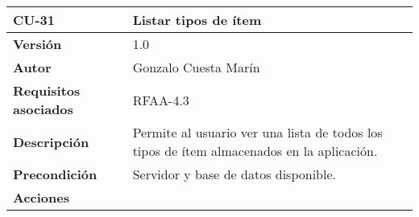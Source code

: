 \begin{longtable}[]{@{}ll@{}}
\toprule
\begin{minipage}[b]{0.18\columnwidth}\raggedright
\textbf{CU-31}\strut
\end{minipage} & \begin{minipage}[b]{0.76\columnwidth}\raggedright
\textbf{Listar tipos de ítem}\strut
\end{minipage}\tabularnewline
\midrule
\endhead
\begin{minipage}[t]{0.18\columnwidth}\raggedright
\textbf{Versión}\strut
\end{minipage} & \begin{minipage}[t]{0.76\columnwidth}\raggedright
1.0\strut
\end{minipage}\tabularnewline
\begin{minipage}[t]{0.18\columnwidth}\raggedright
\textbf{Autor}\strut
\end{minipage} & \begin{minipage}[t]{0.76\columnwidth}\raggedright
Gonzalo Cuesta Marín\strut
\end{minipage}\tabularnewline
\begin{minipage}[t]{0.18\columnwidth}\raggedright
\textbf{Requisitos asociados}\strut
\end{minipage} & \begin{minipage}[t]{0.76\columnwidth}\raggedright
RFAA-4.3\strut
\end{minipage}\tabularnewline
\begin{minipage}[t]{0.18\columnwidth}\raggedright
\textbf{Descripción}\strut
\end{minipage} & \begin{minipage}[t]{0.76\columnwidth}\raggedright
Permite al usuario ver una lista de todos los tipos de ítem almacenados
en la aplicación.\strut
\end{minipage}\tabularnewline
\begin{minipage}[t]{0.18\columnwidth}\raggedright
\textbf{Precondición}\strut
\end{minipage} & \begin{minipage}[t]{0.76\columnwidth}\raggedright
Servidor y base de datos disponible.\strut
\end{minipage}\tabularnewline
\begin{minipage}[t]{0.18\columnwidth}\raggedright
\textbf{Acciones}\strut
\end{minipage} & \begin{minipage}[t]{0.76\columnwidth}\raggedright
\begin{enumerate}

\end{enumerate}
\end{minipage}
\end{longtable}
